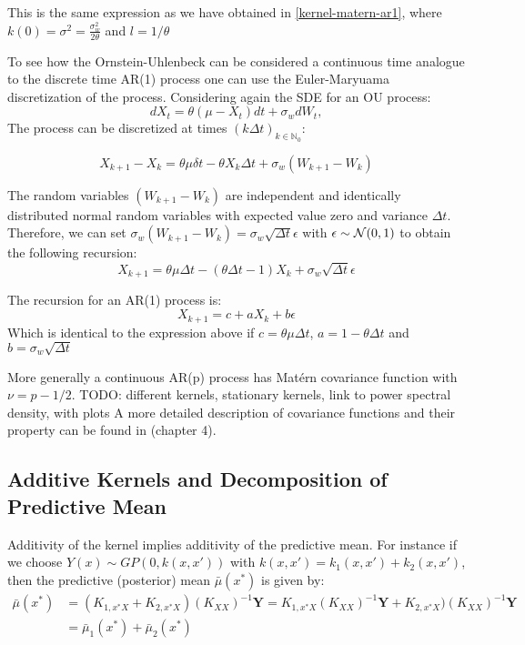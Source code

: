 This is the same expression as we have obtained in \ref{kernel-matern-ar1}, where
$k(0) = \sigma^2 = \frac{\sigma_w^2}{2\theta}$ and $l=1/\theta$

To see how the Ornstein-Uhlenbeck can be considered a continuous time analogue to the discrete time
AR(1) process one can use the Euler-Maryuama discretization of the process.
Considering again the SDE for an OU process:
$$dX_t = \theta (\mu - X_t)dt + \sigma_w dW_t,$$
The process can be discretized at times $(k \Delta t)_{k \in \mathbb{N}_0}$:

$$ X_{k+1} - X_k = \theta \mu \delta t - \theta X_k \Delta t + \sigma_w (W_{k+1} - W_k)$$

The random variables $(W_{k+1} - W_k)$ are independent and identically distributed normal random variables
with expected value zero and variance $\Delta t$.
Therefore, we can set $\sigma_w (W_{k+1} - W_k) = \sigma_w \sqrt{\Delta t} \epsilon$ with $\epsilon \sim \operatorname{\mathcal{N}}(0,1)$
to obtain the following recursion:
$$ X_{k+1} = \theta \mu \Delta t - (\theta \Delta t - 1) X_k + \sigma_w \sqrt{\Delta t} \epsilon$$

The recursion for an AR(1) process is:
$$ X_{k+1} = c + a X_k + b \epsilon$$
Which is identical to the expression above if $c= \theta \mu \Delta t$, $a=1- \theta \Delta t$ and
$b= \sigma_w \sqrt{\Delta t}$



More generally a continuous AR(p) process has Matérn covariance function with $\nu = p - 1/2$.
TODO: different kernels, stationary kernels, link to power spectral density, with plots
A more detailed description of covariance functions and their property can be found
in \citeauthor{rasmussen_gaussian_2006} (chapter 4).



\subsection{Additive Kernels and Decomposition of Predictive Mean}

Additivity of the kernel implies additivity of the predictive mean.
For instance if we choose $Y(x) \sim GP(0, k(x,x'))$ with $k(x,x') = k_1(x, x') + k_2(x,x')$, then
the predictive (posterior) mean $\bar{\mu}(x^{\ast})$
is given by:
\begin{align*}
    \bar{\mu}(x^{\ast}) &= (K_{1, x^{\ast}X} + K_{2, x^{\ast}X}) (K_{XX})^{-1} \mathbf{Y}
    = K_{1, x^{\ast}X} (K_{XX})^{-1} \mathbf{Y} + K_{2, x^{\ast}X}) (K_{XX})^{-1} \mathbf{Y} \\
    &= \bar{\mu}_1(x^{\ast}) + \bar{\mu}_2(x^{\ast})
\end{align*}

